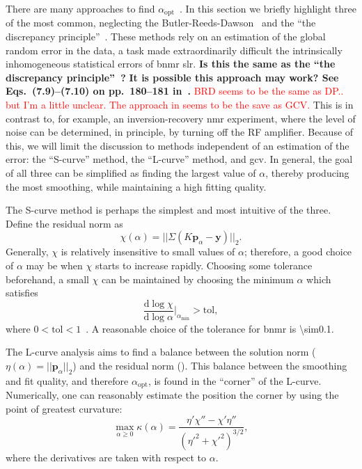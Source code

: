 There are many approaches to find $\alpha_\mathrm{opt}$~\cite{2001-Kilmer-SIAMJMAA-22-1204, 2011-Bauer-MCS-81-1795}. In this section we briefly highlight three of the most common, neglecting the Butler-Reeds-Dawson~\cite{1981-Butler-SIAMJNMA-18-381} and the ``the discrepancy principle''~\cite{1966-Morozon-DANSSR-167-510}. These methods rely on an estimation of the global random error in the data, a task made extraordinarily difficult the intrinsically inhomogeneous statistical errors of \gls{bnmr} \gls{slr}.
\textbf{Is this the same as the ``the discrepancy principle''~\cite{1966-Morozon-DANSSR-167-510}?}
\textbf{It is possible this approach may work? See Eqs.~(7.9)--(7.10) on pp.~180--181 in~\cite{1998-Hansen-RDDIPP}.}
\textcolor{red}{BRD seems to be the same as DP.. but I'm a little unclear. The approach in  seems to be the save as GCV.}
This is in contrast to, for example, an inversion-recovery \gls{nmr} experiment, where the level of noise can be determined, in principle, by turning off the RF amplifier. Because of this, we will limit the discussion to methods independent of an  estimation of the error: the ``S-curve'' method, the ``L-curve'' method, and \gls{gcv}. In general, the goal of all three can be simplified as finding the largest value of $\alpha$, thereby producing the most smoothing, while maintaining a high fitting quality. 

The S-curve method is perhaps the simplest and most intuitive of the three. Define the residual norm as
%
\begin{equation} \label{eq:chi}
   \chi(\alpha) = || \Sigma \left ( K \mathbf{p}_\alpha - \mathbf{y} \right ) ||_2.
\end{equation}
%
Generally, $\chi$ is relatively insensitive to small values of $\alpha$; therefore, a good choice of $\alpha$ may be when $\chi$ starts to increase rapidly. Choosing some tolerance beforehand, a small $\chi$ can be maintained by choosing the minimum $\alpha$ which satisfies
%
\begin{equation}\label{eq:L-opt}
\frac{\mathrm{d}\log\chi}{\mathrm{d}\log\alpha}\Bigg|_{\alpha_\mathrm{min}} > \mathrm{tol},
\end{equation}
%
where $0<\mathrm{tol}<1$~\cite{Zou2016}. A reasonable choice of the tolerance for \gls{bnmr} is \num{\sim0.1}.

The L-curve analysis aims to find a balance between the solution norm ($\eta(\alpha) = || \mathbf{p}_\alpha ||_2$) and the residual norm (). This balance between the smoothing and fit quality, and therefore $\alpha_\mathrm{opt}$, is found in the ``corner'' of the L-curve. Numerically, one can reasonably estimate the position the corner by using the point of greatest curvature:
%
\begin{equation}
\max_{\alpha \ge 0}\kappa(\alpha) =  \frac{\eta'\chi'' - \chi'\eta''}{(\eta'^2+\chi'^2)^{3/2}},
\end{equation}
%
where the derivatives are taken with respect to $\alpha$.

